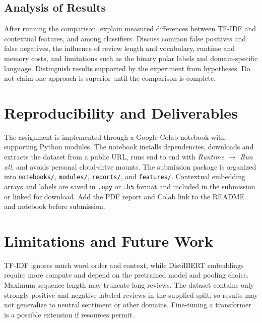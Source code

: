 \subsection{Analysis of Results}
After running the comparison, explain measured differences between TF-IDF and contextual features, and among classifiers. Discuss common false positives and false negatives, the influence of review length and vocabulary, runtime and memory costs, and limitations such as the binary polar labels and domain-specific language. Distinguish results supported by the experiment from hypotheses. Do not claim one approach is superior until the comparison is complete.

\section{Reproducibility and Deliverables}
The assignment is implemented through a Google Colab notebook with supporting Python modules. The notebook installs dependencies, downloads and extracts the dataset from a public URL, runs end to end with \textit{Runtime $\rightarrow$ Run all}, and avoids personal cloud-drive mounts. The submission package is organized into \texttt{notebooks/}, \texttt{modules/}, \texttt{reports/}, and \texttt{features/}. Contextual embedding arrays and labels are saved in \texttt{.npy} or \texttt{.h5} format and included in the submission or linked for download. Add the PDF report and Colab link to the README and notebook before submission.

\section{Limitations and Future Work}
TF-IDF ignores much word order and context, while DistilBERT embeddings require more compute and depend on the pretrained model and pooling choice. Maximum sequence length may truncate long reviews. The dataset contains only strongly positive and negative labeled reviews in the supplied split, so results may not generalize to neutral sentiment or other domains. Fine-tuning a transformer is a possible extension if resources permit.
